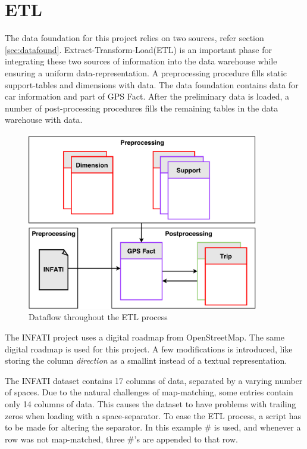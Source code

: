 \section{ETL}\label{sec:ETL}
The data foundation for this project relies on two sources, refer section \ref{sec:datafound}. Extract-Transform-Load(ETL) is an important phase for integrating these two sources of information into the data warehouse while ensuring a uniform data-representation. A preprocessing procedure fills static support-tables and dimensions with data. The data foundation contains data for car information and part of GPS Fact. After the preliminary data is loaded, a number of post-processing procedures fills the remaining tables in the data warehouse with data.

\begin{figure}[tb]
\centering
\includegraphics[width=0.9\textwidth]{Pictures/ETL}
\caption{Dataflow throughout the ETL process}
\label{fig:etl}
\end{figure}

The INFATI project\cite{art:INFATI} uses a digital roadmap from OpenStreetMap\cite{osm}. The same digital roadmap is used for this project. A few modifications is introduced, like storing the column \textit{direction} as a smallint instead of a textual representation. 

The INFATI dataset\cite{art:INFATI} contains 17 columns of data, separated by a varying number of spaces. Due to the natural challenges of map-matching, some entries contain only 14 columns of data. This causes the dataset to have problems with trailing zeros when loading with a space-separator. To ease the ETL process, a script has to be made for altering the separator. In this example \# is used, and whenever a row was not map-matched, three \#'s are appended to that row.

